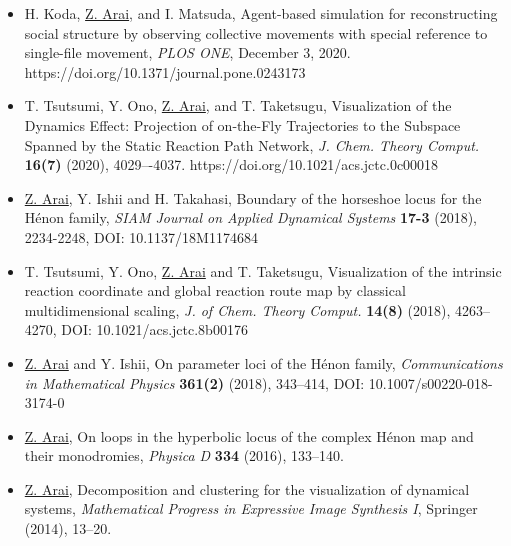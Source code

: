 \documentclass[11pt]{jsarticle}
\begin{document}
\begin{itemize}

\item[{\sf [1]}] 
H. Koda, \underline{Z. Arai}, and I. Matsuda, 
Agent-based simulation for reconstructing social structure by observing collective movements with special reference to single-file movement, 
{\it PLOS ONE}, December 3, 2020.
https://doi.org/10.1371/journal.pone.0243173

\smallskip

\item[{\sf [2]}]
T. Tsutsumi, Y. Ono, \underline{Z. Arai}, and T. Taketsugu, 
Visualization of the Dynamics Effect: Projection of on-the-Fly Trajectories to the Subspace Spanned by the Static Reaction Path Network,
{\it J. Chem. Theory Comput.} {\bf 16(7)} (2020), 4029–-4037.
https://doi.org/10.1021/acs.jctc.0c00018

\smallskip

\item[{\sf [3]}] 
\underline{Z. Arai}, Y. Ishii and H. Takahasi, 
Boundary of the horseshoe locus for the H\'{e}non family, 
{\it SIAM Journal on Applied Dynamical Systems} {\bf 17-3} (2018), 2234-2248,
DOI: 10.1137/18M1174684

\smallskip

\item[{\sf [4]}] T. Tsutsumi, Y. Ono, \underline{Z. Arai} and T. Taketsugu, 
Visualization of the intrinsic reaction coordinate and global reaction route map by classical multidimensional scaling, 
{\it J. of Chem. Theory Comput.} {\bf 14(8)} (2018), 4263--4270,
DOI: 10.1021/acs.jctc.8b00176

\smallskip

\item[{\sf [5]}] 
\underline{Z. Arai} and Y. Ishii,
On parameter loci of the H\'{e}non family, 
{\it Communications in Mathematical Physics} {\bf 361(2)} (2018), 343--414, 
DOI: 10.1007/s00220-018-3174-0

\item[{\sf [6]}] 
{\underline{Z. Arai}}, 
On loops in the hyperbolic locus of the complex H\'enon map and their monodromies,
{\it Physica D} {\bf 334} (2016), 133--140.

\smallskip

\item[{\sf [7]}] 
{\underline{Z. Arai}}, 
{Decomposition and clustering for the visualization of dynamical systems}, 
{\it Mathematical Progress in Expressive Image Synthesis I}, Springer (2014), 13--20.


\end{itemize}
\end{document}
